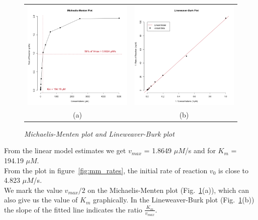 \documentclass[a4paper,10pt]{article}
\begin{document}
                \begin{figure}[H]
                    \centering
                    \begin{tabular}{cc}
                        \includegraphics[width=220px]{../resources/kinetics_mmplot.png} &
                        \includegraphics[width=220px]{../resources/kinetics_lbplot.png} \\
                        (a) & (b)\\
                    \end{tabular}
                    \caption{\it Michaelis-Menten plot and Lineweaver-Burk plot}\label{fig:mm_plot}
                \end{figure}

                \noindent From the linear model estimates we get $v_{max}$ = 1.8649 $\mu M$/s and for $K_m$ = 194.19 $\mu M$.\\
                From the plot in figure~\ref{fig:mm_rates}, the initial rate of reaction $v_0$ is close to 4.823 $\mu M$/s.\\

                We mark the value $v_{max}/2$ on the Michaelis-Menten plot (Fig.~\ref{fig:mm_plot}(a)), which can
                also give us the value of $K_m$ graphically. 
                In the Lineweaver-Burk plot (Fig.~\ref{fig:mm_plot}(b)) the slope of the fitted line indicates 
                the ratio $\frac{K_m}{v_{max}}$.\\
\end{document}
